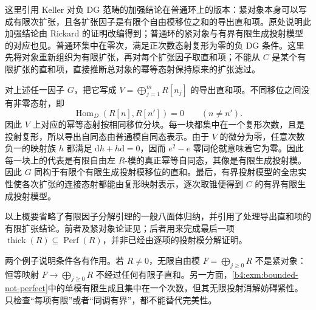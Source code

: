 \begin{proofsketch}
	这里引用 Keller 对负 DG 范畴的加强结论在普通环上的版本：紧对象本身可以写成有限次扩张，且各扩张因子是有限个自由模移位之和的导出直和项\cite[Section 5.3, Remark b]{Keller1994DerivingDG}。原处说明此加强结论由 Rickard 的证明改编得到；普通环的紧对象与有界有限生成投射模型的对应也见\cite[Section 3.1]{Keller1998AbelianDerived}。普通环集中在零次，满足正次数态射复形为零的负 DG 条件。这里先将对象重新组织为有限扩张，再对每个扩张因子取直和项；不能从 \(C\) 是某个有限扩张的直和项，直接推断总对象的幂等态射保持原来的扩张滤过。

	对上述任一因子 \(G\)，把它写成 \(V=\bigoplus_{j=1}^m R[n_j]\) 的导出直和项。不同移位之间没有非零态射，即
	\[
		\operatorname{Hom}_D(R[n],R[n'])=0\qquad(n\ne n').
	\]
	因此 \(V\) 上对应的幂等态射按相同移位分块。每一块都集中在一个复形次数，且是投射复形，所以导出自同态由普通模自同态表示。由于 \(V\) 的微分为零，任意次数负一的映射族 \(h\) 都满足 \(\mathrm dh+h\mathrm d=0\)，因而 \(e^2-e\) 零同伦就意味着它为零。因此每一块上的代表是有限自由左 \(R\)-模的真正幂等自同态，其像是有限生成投射模。因此 \(G\) 同构于有限个有限生成投射模移位的直和。最后，有界投射模型的全忠实性使各次扩张的连接态射都能由复形映射表示，逐次取锥便得到 \(C\) 的有界有限生成投射模型。

	以上概要省略了有限因子分解引理的一般八面体归纳，并引用了处理导出直和项的有限扩张结论。前者及紧对象论证见\cite[Sections 5.1--5.3, especially the lemma in 5.3]{Keller1994DerivingDG}；后者用来完成最后一项 \(\operatorname{thick}(R)\subseteq\operatorname{Perf}(R)\)，并非已经由逐项的投射模分解证明。
\end{proofsketch}

两个例子说明条件各有作用。若 \(R\ne0\)，无限自由模 \(F=\bigoplus_{j\ge0}R\) 不是紧对象：恒等映射 \(F\to\bigoplus_{j\ge0}R\) 不经过任何有限子直和。另一方面，\cref{b4:exm:bounded-not-perfect}中的单模有限生成且集中在一个次数，但其无限投射消解妨碍紧性。只检查“每项有限”或者“同调有界”，都不能替代完美性。
